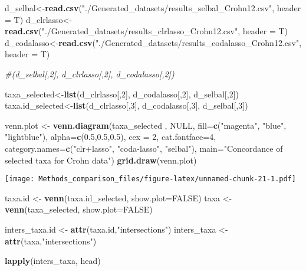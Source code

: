 \documentclass[]{book}
\newenvironment{Shaded}{\begin{snugshade}}{\end{snugshade}}
\newcommand{\KeywordTok}[1]{\textcolor[rgb]{0.13,0.29,0.53}{\textbf{#1}}}
\newcommand{\DataTypeTok}[1]{\textcolor[rgb]{0.13,0.29,0.53}{#1}}
\newcommand{\DecValTok}[1]{\textcolor[rgb]{0.00,0.00,0.81}{#1}}
\newcommand{\FloatTok}[1]{\textcolor[rgb]{0.00,0.00,0.81}{#1}}
\newcommand{\StringTok}[1]{\textcolor[rgb]{0.31,0.60,0.02}{#1}}
\newcommand{\CommentTok}[1]{\textcolor[rgb]{0.56,0.35,0.01}{\textit{#1}}}
\newcommand{\OtherTok}[1]{\textcolor[rgb]{0.56,0.35,0.01}{#1}}
\newcommand{\NormalTok}[1]{#1}
\begin{document}
\begin{Shaded}
\begin{Highlighting}[]
\NormalTok{d_selbal<-}\KeywordTok{read.csv}\NormalTok{(}\StringTok{"./Generated_datasets/results_selbal_Crohn12.csv"}\NormalTok{, }\DataTypeTok{header =}\NormalTok{ T)}
\NormalTok{d_clrlasso<-}\KeywordTok{read.csv}\NormalTok{(}\StringTok{"./Generated_datasets/results_clrlasso_Crohn12.csv"}\NormalTok{, }\DataTypeTok{header =}\NormalTok{ T)}
\NormalTok{d_codalasso<-}\KeywordTok{read.csv}\NormalTok{(}\StringTok{"./Generated_datasets/results_codalasso_Crohn12.csv"}\NormalTok{, }\DataTypeTok{header =}\NormalTok{ T)}

\CommentTok{#(d_selbal[,2], d_clrlasso[,2], d_codalasso[,2])}
  
\NormalTok{taxa_selected<-}\KeywordTok{list}\NormalTok{(d_clrlasso[,}\DecValTok{2}\NormalTok{], d_codalasso[,}\DecValTok{2}\NormalTok{], d_selbal[,}\DecValTok{2}\NormalTok{])}
\NormalTok{taxa.id_selected<-}\KeywordTok{list}\NormalTok{(d_clrlasso[,}\DecValTok{3}\NormalTok{], d_codalasso[,}\DecValTok{3}\NormalTok{], d_selbal[,}\DecValTok{3}\NormalTok{])}


\NormalTok{venn.plot <-}\StringTok{ }\KeywordTok{venn.diagram}\NormalTok{(taxa_selected , }\OtherTok{NULL}\NormalTok{, }\DataTypeTok{fill=}\KeywordTok{c}\NormalTok{(}\StringTok{"magenta"}\NormalTok{, }\StringTok{"blue"}\NormalTok{, }\StringTok{"lightblue"}\NormalTok{), }
                          \DataTypeTok{alpha=}\KeywordTok{c}\NormalTok{(}\FloatTok{0.5}\NormalTok{,}\FloatTok{0.5}\NormalTok{,}\FloatTok{0.5}\NormalTok{), }\DataTypeTok{cex =} \DecValTok{2}\NormalTok{, }\DataTypeTok{cat.fontface=}\DecValTok{4}\NormalTok{, }
                          \DataTypeTok{category.names=}\KeywordTok{c}\NormalTok{(}\StringTok{"clr+lasso"}\NormalTok{, }\StringTok{"coda-lasso"}\NormalTok{, }\StringTok{"selbal"}\NormalTok{),}
                          \DataTypeTok{main=}\StringTok{"Concordance of selected taxa for Crohn data"}\NormalTok{)}
\KeywordTok{grid.draw}\NormalTok{(venn.plot)}
\end{Highlighting}
\end{Shaded}

\texttt{[image: Methods\_comparison\_files/figure-latex/unnamed-chunk-21-1.pdf]}

\begin{Shaded}
\begin{Highlighting}[]
\NormalTok{taxa.id <-}\StringTok{ }\KeywordTok{venn}\NormalTok{(taxa.id_selected, }\DataTypeTok{show.plot=}\OtherTok{FALSE}\NormalTok{)}
\NormalTok{taxa <-}\StringTok{ }\KeywordTok{venn}\NormalTok{(taxa_selected, }\DataTypeTok{show.plot=}\OtherTok{FALSE}\NormalTok{)}

\NormalTok{inters_taxa.id <-}\StringTok{ }\KeywordTok{attr}\NormalTok{(taxa.id,}\StringTok{"intersections"}\NormalTok{)}
\NormalTok{inters_taxa <-}\StringTok{ }\KeywordTok{attr}\NormalTok{(taxa,}\StringTok{"intersections"}\NormalTok{)}

\KeywordTok{lapply}\NormalTok{(inters_taxa, head) }
\end{Highlighting}
\end{Shaded}
\end{document}
